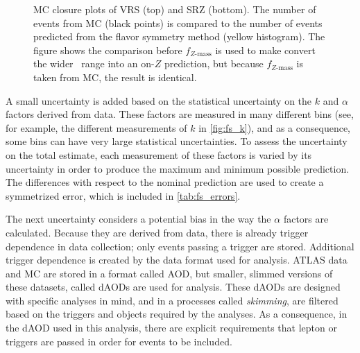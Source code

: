 \begin{centering}
\begin{figure}[!hbt]
\caption{\ac{MC} closure plots of VRS (top) and SRZ (bottom). The number of events from MC (black points) is compared to the number of events predicted from the flavor symmetry method (yellow histogram). The figure shows the comparison before $f_{Z \mathrm{\text{-}mass}}$ is used to make convert the wider \mll~range into an on-$Z$ prediction, but because $f_{Z \mathrm{\text{-}mass}}$ is taken from \ac{MC}, the result is identical.}
\label{fig:fs_closure}
\end{figure}
\end{centering}

A small uncertainty is added based on the statistical uncertainty on the $k$ and $\alpha$ factors derived from data. These factors are measured in many different bins (see, for example, the different measurements of $k$ in \autoref{fig:fs_k}), and as a consequence, some bins can have very large statistical uncertainties. To assess the uncertainty on the total estimate, each measurement of these factors is varied by its uncertainty in order to produce the maximum and minimum possible prediction. The differences with respect to the nominal prediction are used to create a symmetrized error, which is included in \autoref{tab:fs_errors}.

The next uncertainty considers a potential bias in the way the $\alpha$ factors are calculated. Because they are derived from data, there is already trigger dependence in data collection; only events passing a trigger are stored. Additional trigger dependence is created by the data format used for analysis. \ac{ATLAS} data and \ac{MC} are stored in a format called \ac{AOD}, but smaller, slimmed versions of these datasets, called \acp{dAOD} are used for analysis. These \acp{dAOD} are designed with specific analyses in mind, and in a processes called \textit{skimming}, are filtered based on the triggers and objects required by the analyses. As a consequence, in the \ac{dAOD} used in this analysis, there are explicit requirements that lepton or \met triggers are passed in order for events to be included. 

